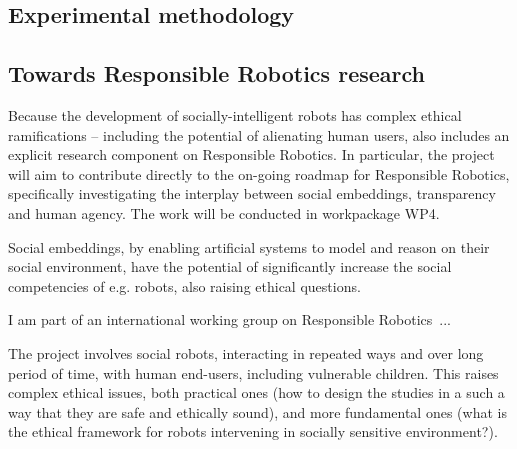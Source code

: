 \subsection{Experimental methodology}


\subsection{Towards Responsible Robotics research}

\begin{rewrite}

Because the development of socially-intelligent robots has
complex ethical ramifications -- including the potential of alienating
human users, \project also includes an explicit research component on
Responsible Robotics. In particular, the project will aim to contribute directly
to the on-going roadmap for Responsible Robotics, specifically
investigating the interplay between social embeddings, transparency and human
agency. The work will be conducted in workpackage WP4.


Social embeddings, by enabling artificial systems to model and reason on their
social environment, have the potential of significantly increase the social
competencies of e.g. robots, also raising ethical questions.

I am part of an international working group on Responsible Robotics~...

%




The \project project involves social robots, interacting in repeated ways and
over long period of time, with human end-users, including vulnerable children.
This raises complex ethical issues, both practical ones (how to design the
\project studies in a such a way that they are safe and ethically sound), and
more fundamental ones (what is the ethical framework for robots intervening in
socially sensitive environment?).




\end{rewrite}
